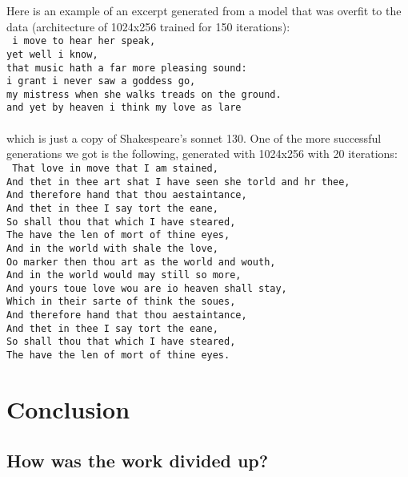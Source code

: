 \indent Here is an example of an excerpt generated from a model that was overfit to the data (architecture of 1024x256 trained for 150 iterations): \\
\texttt{
    i move to hear her speak, \\
    yet well i know, \\
    that music hath a far more pleasing sound: \\
    i grant i never saw a goddess go, \\
    my mistress when she walks treads on the ground. \\
    and yet by heaven i think my love as lare \\
} \\
which is just a copy of Shakespeare's sonnet 130. One of the more successful generations we got is the following, generated with 1024x256 with 20 iterations: \\
\texttt{
    That love in move that I am stained, \\
    And thet in thee art shat I have seen she torld and hr thee, \\
    And therefore hand that thou aestaintance, \\
    And thet in thee I say tort the eane, \\
    So shall thou that which I have steared, \\
    The have the len of mort of thine eyes, \\
    And in the world with shale the love, \\
    Oo marker then thou art as the world and wouth, \\
    And in the world would may still so more, \\
    And yours toue love wou are io heaven shall stay, \\
    Which in their sarte of think the soues, \\
    And therefore hand that thou aestaintance, \\
    And thet in thee I say tort the eane, \\
    So shall thou that which I have steared, \\
    The have the len of mort of thine eyes. \\
}


\section{Conclusion}
\medskip

\subsection{How was the work divided up?}
